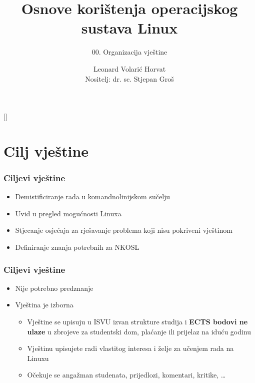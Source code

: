 \documentclass{beamer}
\title{Osnove korištenja operacijskog sustava Linux}
\subtitle{00. Organizacija vještine}
\author[Leonard Volarić Horvat]{Leonard Volarić Horvat\\{\small Nositelj: dr. sc. Stjepan Groš}}
\institute[FER]{Sveučilište u Zagrebu \\
				Fakultet elektrotehnike i računarstva}
\date{\todayiso}
\begin{document}
{
[] %

\begin{frame}
\maketitle
\end{frame}
}

\section{Cilj vještine}
\begin{frame}[t]
	\frametitle{Ciljevi vještine}
	\begin{itemize}
		\item Demistificiranje rada u komandnolinijskom sučelju
		\item Uvid u pregled mogućnosti Linuxa
		\item Stjecanje osjećaja za rješavanje problema koji nisu pokriveni vještinom
		\item Definiranje znanja potrebnih za NKOSL
	\end{itemize}
\end{frame}

\begin{frame}[t]
	\frametitle{Ciljevi vještine}
	\begin{itemize}
		\item Nije potrebno predznanje
		\item Vještina je izborna
		\begin{itemize}
			\item Vještine se upisuju u ISVU izvan strukture studija i \textbf{ECTS bodovi ne ulaze} u zbrojeve za studentski dom, plaćanje ili prijelaz na iduću godinu
			\item Vještinu upisujete radi vlastitog interesa i želje za učenjem rada na Linuxu
			\item Očekuje se angažman studenata, prijedlozi, komentari, kritike, \ldots
		\end{itemize}
	\end{itemize}
\end{frame}
\end{document}
